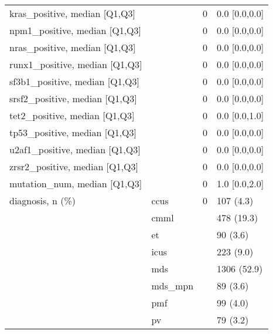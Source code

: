 \begin{tabular}{llll}
kras\_positive, median [Q1,Q3] &    &      0 &     0.0 [0.0,0.0] \\
npm1\_positive, median [Q1,Q3] &    &      0 &     0.0 [0.0,0.0] \\
nras\_positive, median [Q1,Q3] &    &      0 &     0.0 [0.0,0.0] \\
runx1\_positive, median [Q1,Q3] &    &      0 &     0.0 [0.0,0.0] \\
sf3b1\_positive, median [Q1,Q3] &    &      0 &     0.0 [0.0,0.0] \\
srsf2\_positive, median [Q1,Q3] &    &      0 &     0.0 [0.0,0.0] \\
tet2\_positive, median [Q1,Q3] &    &      0 &     0.0 [0.0,1.0] \\
tp53\_positive, median [Q1,Q3] &    &      0 &     0.0 [0.0,0.0] \\
u2af1\_positive, median [Q1,Q3] &    &      0 &     0.0 [0.0,0.0] \\
zrsr2\_positive, median [Q1,Q3] &    &      0 &     0.0 [0.0,0.0] \\
mutation\_num, median [Q1,Q3] &    &      0 &     1.0 [0.0,2.0] \\
diagnosis, n (\%) & ccus &      0 &         107 (4.3) \\
                 & cmml &        &        478 (19.3) \\
                 & et &        &          90 (3.6) \\
                 & icus &        &         223 (9.0) \\
                 & mds &        &       1306 (52.9) \\
                 & mds\_mpn &        &          89 (3.6) \\
                 & pmf &        &          99 (4.0) \\
                 & pv &        &          79 (3.2) \\
\bottomrule
\end{tabular}
